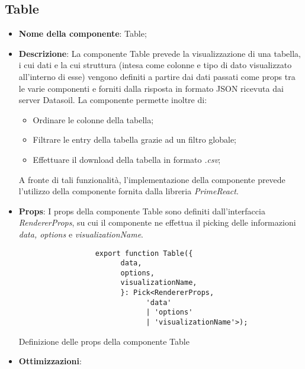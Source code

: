 \subsection{Table}
\begin{itemize}
      \item \textbf{Nome della componente}: Table;
      \item \textbf{Descrizione}: La componente Table prevede la visualizzazione di una tabella, i cui dati e la cui struttura (intesa come colonne e tipo di dato visualizzato
            all'interno di esse) vengono definiti a partire dai dati passati come props tra le varie componenti e forniti dalla risposta in formato JSON ricevuta dai server Datasoil. \newline
            La componente permette inoltre di:
            \begin{itemize}
                  \item Ordinare le colonne della tabella;
                  \item Filtrare le entry della tabella grazie ad un filtro globale;
                  \item Effettuare il download della tabella in formato \textit{.csv};
            \end{itemize}
            A fronte di tali funzionalità, l'implementazione della componente prevede l'utilizzo della componente fornita dalla libreria \textit{PrimeReact}.
      \item \textbf{Props}: I props della componente Table sono definiti dall'interfaccia \textit{RendererProps}, su cui il componente ne effettua il picking
            delle informazioni \textit{data, options} e \textit{visualizationName}.
            \begin{listing}[H]
                  \begin{verbatim}
                  export function Table({
                        data,
                        options,
                        visualizationName,
                        }: Pick<RendererProps, 
                              'data' 
                              | 'options' 
                              | 'visualizationName'>);
                  \end{verbatim}
                  \caption{Definizione delle props della componente Table}
                  \label{listing:tableProps}
            \end{listing}
      \item \textbf{Ottimizzazioni}:
            \begin{itemize}

\end{itemize}
\end{itemize}
